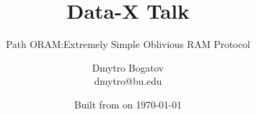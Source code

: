 


\title{Data-X Talk} %

\subtitle{Path ORAM:\@An Extremely Simple Oblivious RAM Protocol}

\date{Built from \href{https://git.dbogatov.org/bu/PathORAM-Talk/commit/\version}{\emph{\version}} on \today}

\author{Dmytro Bogatov \\ dmytro@bu.edu}



\makeatletter
\def\beamer@framenotesbegin{%
	\usebeamercolor[fg]{normal text} 
		\gdef\beamer@noteitems{}%
		\gdef\beamer@notes{}%
}
\makeatother


\newcommand{\BigO}[1]{\mathcal{O}\left(#1\right)}
\newcommand{\RAM}{\textbf{RAM}}